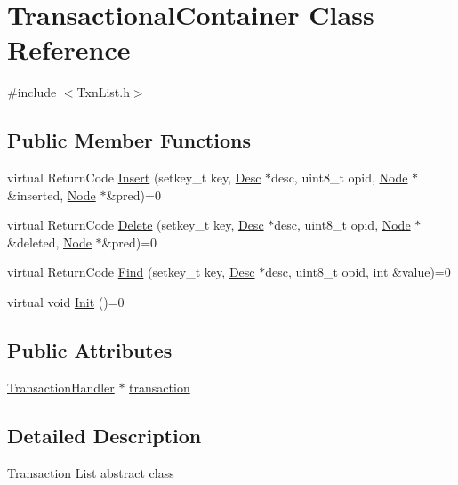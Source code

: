 \hypertarget{classTransactionalContainer}{}\section{Transactional\+Container Class Reference}
\label{classTransactionalContainer}


{\ttfamily \#include $<$Txn\+List.\+h$>$}

\subsection*{Public Member Functions}
\begin{DoxyCompactItemize}
\item 
virtual Return\+Code \hyperlink{classTransactionalContainer_a4154c375844a863a4c5692125a1d22a7}{Insert} (setkey\+\_\+t key, \hyperlink{structDesc}{Desc} $\ast$desc, uint8\+\_\+t opid, \hyperlink{structNode}{Node} $\ast$\&inserted, \hyperlink{structNode}{Node} $\ast$\&pred)=0
\item 
virtual Return\+Code \hyperlink{classTransactionalContainer_a3018917719372e1ddf3bf7adbdcdfa7b}{Delete} (setkey\+\_\+t key, \hyperlink{structDesc}{Desc} $\ast$desc, uint8\+\_\+t opid, \hyperlink{structNode}{Node} $\ast$\&deleted, \hyperlink{structNode}{Node} $\ast$\&pred)=0
\item 
virtual Return\+Code \hyperlink{classTransactionalContainer_ab02a3c0cce9358190316e0e52f80e100}{Find} (setkey\+\_\+t key, \hyperlink{structDesc}{Desc} $\ast$desc, uint8\+\_\+t opid, int \&value)=0
\item 
virtual void \hyperlink{classTransactionalContainer_a5e8c0c1afa2343866f259f9dec8dfe61}{Init} ()=0
\end{DoxyCompactItemize}
\subsection*{Public Attributes}
\begin{DoxyCompactItemize}
\item 
\hyperlink{classTransactionHandler}{Transaction\+Handler} $\ast$ \hyperlink{classTransactionalContainer_a78f2a4bc185a5052d705c1be8e5b016b}{transaction}
\end{DoxyCompactItemize}


\subsection{Detailed Description}
Transaction List abstract class

